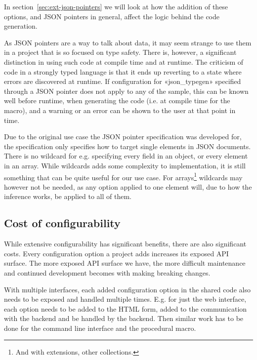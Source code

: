 In section~\ref{sec:ext-json-pointers} we will look at how the addition of these options, and JSON pointers in general, affect the logic behind the code generation.

As JSON pointers are a  way to talk about data, it may seem strange to use them in a project that is so focused on type safety. There is, however, a significant distinction in using such code at compile time and at runtime. The criticism of  code in a strongly typed language is that it ends up reverting to a state where errors are discovered at runtime. If configuration for «json_typegen» specified through a JSON pointer does not apply to any of the sample, this can be known well before runtime, when generating the code (i.e. at compile time for the macro), and a warning or an error can be shown to the user at that point in time.

Due to the original use case the JSON pointer specification was developed for, the specification only specifies how to target single elements in JSON documents. There is no wildcard for e.g. specifying every field in an object, or every element in an array. While wildcards adds some complexity to implementation, it is still something that can be quite useful for our use case. For arrays\footnote{And with extensions, other collections.} wildcards may however not be needed, as any option applied to one element will, due to how the inference works, be applied to all of them.


\subsection{Cost of configurability}

While extensive configurability has significant benefits, there are also significant costs. Every configuration option a project adds increases its exposed API surface. The more exposed API surface we have, the more difficult maintenance and continued development becomes with making breaking changes.

With multiple interfaces, each added configuration option in the shared code also needs to be exposed and handled multiple times. E.g. for just the web interface, each option needs to be added to the HTML form, added to the communication with the backend and be handled by the backend. Then similar work has to be done for the command line interface and the procedural macro.

